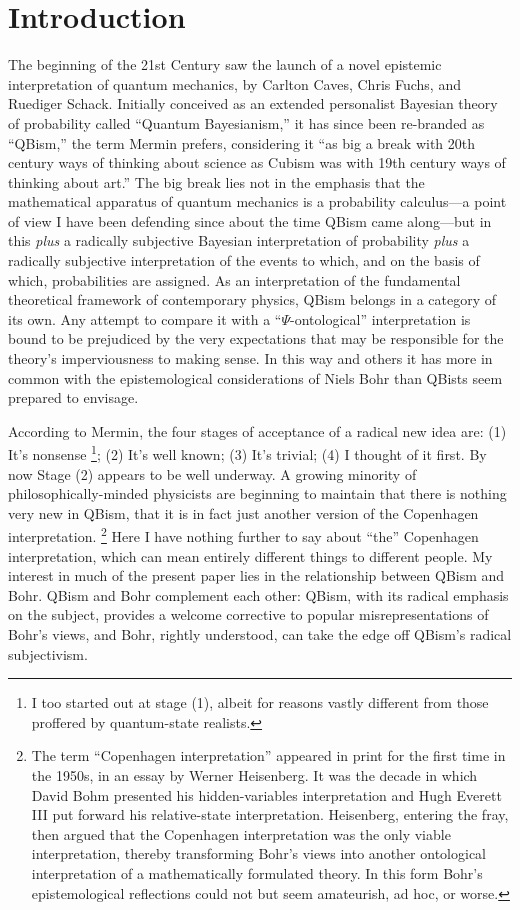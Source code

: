 \documentclass[smallextended]{svjour3}
\begin{document}
\section{Introduction}
The beginning of the 21st Century saw the launch of a novel epistemic interpretation of quantum mechanics, by {Carlton Caves}, {Chris Fuchs}, and {Ruediger Schack}.\cite{CFS2002} Initially conceived as an extended personalist Bayesian theory of probability called {``Quantum Bayesianism},'' it has since been re-branded as ``QBism,'' the term Mermin\cite{MerminQBnotCop} prefers, considering it ``as big a break with 20th century ways of thinking about science as Cubism was with 19th century ways of thinking about art.'' The big break lies not in the emphasis that the mathematical apparatus of quantum mechanics is a probability calculus---a point of view I have been defending since about the time QBism came along---but in this \emph{plus} a radically subjective Bayesian interpretation of probability \emph{plus} a radically subjective interpretation of the events to which, and on the basis of which, probabilities are assigned. As an interpretation of the fundamental theoretical framework of contemporary physics, QBism belongs in a category of its own. Any attempt to compare it with a \hbox{``$\Psi$-ontological''} interpretation is bound to be prejudiced by the very expectations that may be responsible for the theory's imperviousness to making sense. In this way and others it has more in common with the epistemological considerations of Niels Bohr than QBists seem prepared to envisage.

According to Mermin,\cite{MerminQBnotCop} the four stages of acceptance of a radical new idea are: (1) It's nonsense%
\footnote{I too started out at stage (1), albeit for reasons vastly different from those proffered by quantum-state realists.}; 
(2) It's well known; (3) It's trivial; (4) I thought of it first. By now Stage (2) appears to be well underway. A growing minority of philosophically-minded physicists are beginning to maintain that there is nothing very new in QBism, that it is in fact just another version of the Copenhagen interpretation.%
\footnote{The term ``Copenhagen interpretation'' appeared in print for the first time in the 1950s, in an essay by Werner Heisenberg.\cite{Heisenberg1955} It was the decade in which David Bohm\cite{BohmHV} presented his hidden-variables interpretation and Hugh Everett III\cite{EverettRSF} put forward his relative-state interpretation. Heisenberg, entering the fray, then argued that the Copenhagen interpretation was the only viable interpretation, thereby transforming Bohr's views into another ontological interpretation of a mathematically formulated theory. In this form Bohr's epistemological reflections could not but seem amateurish, ad hoc, or worse.}
Here I have nothing further to say about ``the'' Copenhagen interpretation, which can mean entirely different things to different people. My interest in much of the present paper lies in the relationship between QBism and Bohr. QBism and Bohr complement each other: QBism, with its radical emphasis on the subject, provides a welcome corrective to popular misrepresentations of Bohr's views, and Bohr, rightly understood, can take the edge off QBism's radical subjectivism.
\end{document}
